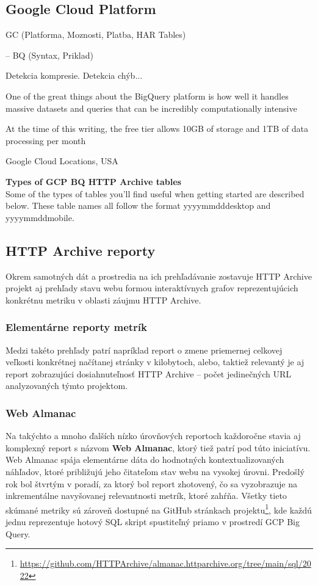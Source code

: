 {\subsection{Google Cloud Platform}
GC (Platforma, Moznosti, Platba, HAR Tables)

-- BQ (Syntax, Priklad)

Detekcia kompresie. Detekcia chýb...

One of the great things about the BigQuery platform is how well it handles massive datasets and queries that can be incredibly computationally intensive

At the time of this writing, the free tier allows 10GB of storage and 1TB of data processing per month

Google Cloud Locations, USA

\textbf{Types of GCP BQ HTTP Archive tables}
\\
Some of the types of tables you'll find useful when getting started are described below. These table names all follow the format yyyy\textunderscore mm\textunderscore dd\textunderscore desktop and yyyy\textunderscore mm\textunderscore dd\textunderscore mobile.


\subsection{HTTP Archive reporty}

Okrem samotných dát a prostredia na ich prehľadávanie zostavuje HTTP Archive projekt aj prehľady stavu webu formou interaktívnych grafov reprezentujúcich konkrétnu metriku v oblasti záujmu HTTP Archive.

\subsubsection{Elementárne reporty metrík}
Medzi takéto prehľady patrí napríklad report o zmene priemernej celkovej veľkosti konkrétnej načítanej stránky v kilobytoch, alebo, taktiež relevantý je aj report zobrazujúci dosiahnuteľnosť HTTP Archive --
počet jedinečných URL analyzovaných týmto projektom.


\subsubsection{Web Almanac}
Na takýchto a mnoho ďalších nízko úrovňových reportoch každoročne stavia aj komplexný report s názvom \textbf{Web Almanac}, ktorý tiež patrí pod túto iniciatívu.
Web Almanac spája elementárne dáta do hodnotných kontextualizovaných náhľadov, ktoré približujú jeho čitateľom stav webu na vysokej úrovni.\cite{httparchive-methodology}
Predošlý rok bol štvrtým v poradí, za ktorý bol report zhotovený, čo sa vyzobrazuje na inkrementálne navyšovanej relevantnosti metrík, ktoré zahŕňa. 
Všetky tieto skúmané metriky sú zároveň dostupné na GitHub stránkach projektu\footnote{\href{https://github.com/HTTPArchive/almanac.httparchive.org/tree/main/sql/2022}{https://github.com/HTTPArchive/almanac.httparchive.org/tree/main/sql/2022}}, kde každú jednu reprezentuje hotový SQL skript spustiteľný priamo v prostredí GCP Big Query.

}
